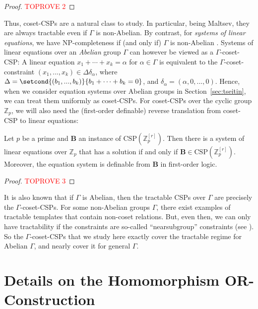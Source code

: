 \documentclass[a4paper,english, thm-restate]{lipics-v2021}
\newcommand{\StructB}{\mathbf{B}}
\newcommand{\CSP}[1]{\mathrm{CSP}(#1)}
\newcommand{\bbZ}{\mathbb{Z}}
\newcommand{\CosetGrpTmplt}[2]{#1^{[#2]}}
\begin{document}
	
	\groupCSPMaltsev*
	\begin{proof}\textcolor{red}{TOPROVE 2}\end{proof}	
	
	Thus, coset-CSPs are a natural class to study. In particular, being Maltsev, they are always tractable even if $\Gamma$ is non-Abelian. By contrast, for \emph{systems of linear equations}, we have NP-completeness if (and only if) $\Gamma$ is non-Abelian \cite{GOLDMANN}. 
	Systems of linear equations over an \emph{Abelian} group $\Gamma$
	can however be viewed as a $\Gamma$-coset-CSP:
	A linear equation $x_1 + \cdots + x_k = \alpha$ for $\alpha \in \Gamma$
	is equivalent to the $\Gamma$-coset-constraint
	$(x_1,...,x_k) \in \Delta\delta_\alpha$,
	where $\Delta = \setcond{ (b_1,...,b_k)}{b_1+\dots+b_k = 0}$,
	and $\delta_\alpha = (\alpha,0,...,0)$.
	Hence, when we consider equation systems over Abelian groups in Section~\ref{sec:tseitin}, we can treat them uniformly as coset-CSPs. 
	For coset-CSPs over the cyclic group $\bbZ_p$, we will also need the (first-order definable) reverse translation from coset-CSP to linear equations: 
	\begin{lemma}
		\label{lem:ZpcosetsAreEquations}
		Let $p$ be a prime and $\StructB$ an instance of $\CSP{\CosetGrpTmplt{\bbZ_p}{r}}$.
		Then there is a system of linear equations over $\bbZ_p$ that has a solution if and only if $\StructB \in \CSP{\CosetGrpTmplt{\bbZ_p}{r}}$. Moreover, the equation system is definable from $\StructB$ in first-order logic. 
	\end{lemma}	
	\begin{proof}\textcolor{red}{TOPROVE 3}\end{proof}	
	
	
	
	It is also known that if $\Gamma$ is Abelian, then the tractable CSPs over $\Gamma$ are precisely the $\Gamma$-coset-CSPs. For some non-Abelian groups $\Gamma$, there exist examples of tractable templates that contain non-coset relations. But, even then, we can only have tractability if the constraints are so-called ``nearsubgroup'' constraints (see \cite{feder1993monotone}).
	So the $\Gamma$-coset-CSPs that we study here exactly cover the tractable regime for Abelian $\Gamma$, and nearly cover it for general $\Gamma$.
	
	
	
	\section{Details on the Homomorphism OR-Construction}
	\label{app:homomorphism-or}
	
\end{document}
